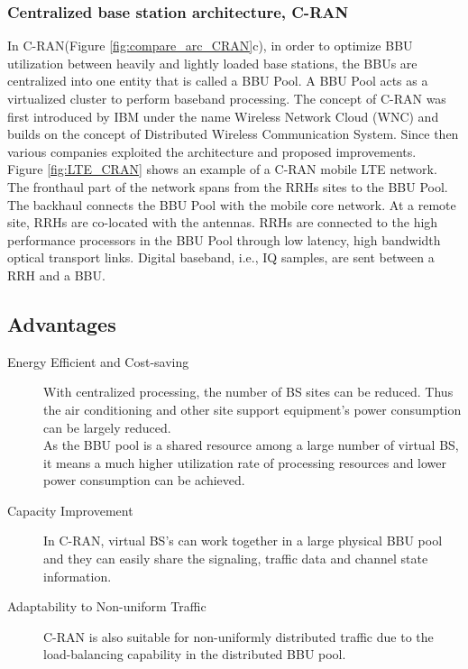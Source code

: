 \documentclass[notitlepage,hidelinks]{article}
\begin{document}


\subsubsection{Centralized base station architecture, C-RAN} 

In C-RAN(Figure \ref{fig:compare_arc_CRAN}c), in order to optimize BBU utilization between
heavily and lightly loaded base stations, the BBUs are 
centralized into one entity that is called a BBU Pool.
A BBU Pool acts as a virtualized cluster to perform baseband 
processing. The concept of C-RAN was first introduced by IBM
under the name Wireless Network Cloud (WNC) and builds
on the concept of Distributed Wireless Communication System.
Since then various companies exploited the architecture and 
proposed improvements.\\


Figure \ref{fig:LTE_CRAN} shows an example of a C-RAN mobile LTE
network. The fronthaul part of the network spans from the
RRHs sites to the BBU Pool. The backhaul connects the BBU
Pool with the mobile core network. At a remote site, RRHs are
co-located with the antennas. RRHs are connected to the high
performance processors in the BBU Pool through low latency,
high bandwidth optical transport links. Digital baseband, i.e.,
IQ samples, are sent between a RRH and a BBU.\nocite{checko14}




\subsection{Advantages}\nocite{cmri11}

\begin{description}
    
    \item [Energy Efficient and Cost-saving] With centralized 
    processing, the number of BS sites can be reduced. Thus 
    the air conditioning and other site support equipment's 
    power consumption can be largely reduced.\\ 
    As the BBU pool is a shared resource among a large number
    of virtual BS, it means a much higher utilization rate of
    processing resources and lower power consumption can be
    achieved.
    
    \item [Capacity Improvement] In C-RAN, virtual BS's can work
    together in a large physical BBU pool and they can easily 
    share the signaling, traffic data and channel state 
    information. 
    
    \item [Adaptability to Non-uniform Traffic] C-RAN is also
    suitable for non-uniformly distributed traffic due to the 
    load-balancing capability in the distributed BBU pool.
    
\end{description}
\end{document}
